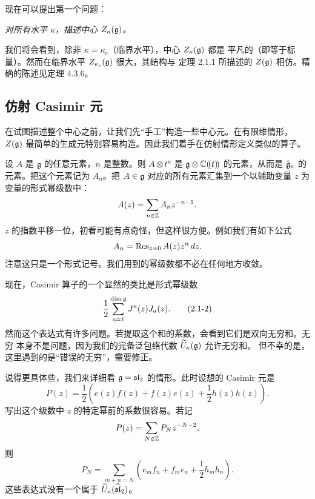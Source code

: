 现在可以提出第一个问题：
\begin{center}
    \itshape 对所有水平 $\kappa$，描述中心 $Z_\kappa(\mathfrak{g})$。
\end{center}
我们将会看到，除非 $\kappa=\kappa_c$（临界水平），中心 $Z_\kappa(\mathfrak{g})$ 都是
平凡的（即等于标量）。然而在临界水平 $Z_{\kappa_c}(\mathfrak{g})$ 很大，其结构与
定理 2.1.1 所描述的 $Z(\mathfrak{g})$ 相仿。精确的陈述见定理 4.3.6。

\subsection{仿射 Casimir 元}

在试图描述整个中心之前，让我们先“手工”构造一些中心元。在有限维情形，
$Z(\mathfrak{g})$ 最简单的生成元特别容易构造。因此我们着手在仿射情形定义类似的算子。

设 $A$ 是 $\mathfrak{g}$ 的任意元素，$n$ 是整数。则 $A\otimes t^n$ 是
$\mathfrak{g}\otimes\mathbb{C}(\!(t)\!)$ 的元素，从而是 $\hat{\mathfrak{g}}_\kappa$ 的元素。把这个元素记为
$A_n$。把 $A\in\mathfrak{g}$ 对应的所有元素汇集到一个以辅助变量 $z$ 为变量的形式幂级数中：
\[
    A(z)=\sum_{n\in\mathbb{Z}}A_nz^{-n-1}.
\]
$z$ 的指数平移一位，初看可能有点奇怪，但这样很方便。例如我们有如下公式
\[
    A_n=\operatorname{Res}_{z=0}A(z)z^n\,dz.
\]
注意这只是一个形式记号。我们用到的幂级数都不必在任何地方收敛。

现在，Casimir 算子的一个显然的类比是形式幂级数
\begin{equation}
    \frac12\sum_{a=1}^{\dim\mathfrak{g}}J^a(z)J_a(z).
    \tag{2.1-2}
\end{equation}
然而这个表达式有许多问题。若提取这个和的系数，会看到它们是双向无穷和。无穷
本身不是问题，因为我们的完备泛包络代数 $\widetilde U_\kappa(\mathfrak{g})$ 允许无穷和。
但不幸的是，这里遇到的是“错误的无穷”，需要修正。

说得更具体些，我们来详细看 $\mathfrak{g}=\mathfrak{sl}_2$ 的情形。此时设想的 Casimir 元是
\begin{equation}
    P(z)=\frac12\left(e(z)f(z)+f(z)e(z)+\frac12h(z)h(z)\right).
    \tag{2.1-3}
\end{equation}
写出这个级数中 $z$ 的特定幂前的系数很容易。若记
\[
    P(z)=\sum_{N\in\mathbb{Z}}P_Nz^{-N-2},
\]
则
\begin{equation}
    P_N=\sum_{m+n=N}\left(e_mf_n+f_me_n+\frac12h_mh_n\right).
    \tag{2.1-4}
\end{equation}
这些表达式没有一个属于 $\widetilde U_\kappa(\widehat{\mathfrak{sl}}_2)$。


